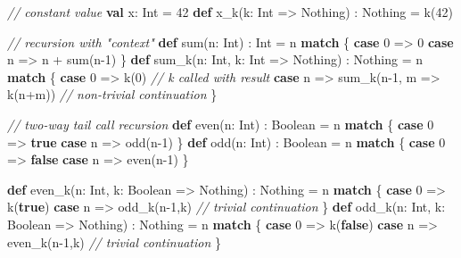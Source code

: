 \documentclass[]{article}
\newenvironment{Shaded}{}{}
\newcommand{\CommentTok}[1]{\textcolor[rgb]{0.38,0.63,0.69}{\textit{#1}}}
\newcommand{\DecValTok}[1]{\textcolor[rgb]{0.25,0.63,0.44}{#1}}
\newcommand{\FunctionTok}[1]{\textcolor[rgb]{0.02,0.16,0.49}{#1}}
\newcommand{\KeywordTok}[1]{\textcolor[rgb]{0.00,0.44,0.13}{\textbf{#1}}}
\newcommand{\NormalTok}[1]{#1}
\begin{document}
\begin{Shaded}
\begin{Highlighting}[]
\CommentTok{// constant value}
\KeywordTok{val}\NormalTok{ x: Int = }\DecValTok{42}
\KeywordTok{def} \FunctionTok{x\_k}\NormalTok{(k: Int =\textgreater{} Nothing) : Nothing = }\FunctionTok{k}\NormalTok{(}\DecValTok{42}\NormalTok{)}

\CommentTok{// recursion with "context"}
\KeywordTok{def} \FunctionTok{sum}\NormalTok{(n: Int) : Int = n }\KeywordTok{match}\NormalTok{ \{}
  \KeywordTok{case} \DecValTok{0}\NormalTok{ =\textgreater{} }\DecValTok{0}
  \KeywordTok{case}\NormalTok{ n =\textgreater{} n + }\FunctionTok{sum}\NormalTok{(n}\DecValTok{{-}1}\NormalTok{)}
\NormalTok{\}}
\KeywordTok{def} \FunctionTok{sum\_k}\NormalTok{(n: Int, k: Int =\textgreater{} Nothing) : Nothing = n }\KeywordTok{match}\NormalTok{ \{}
  \KeywordTok{case} \DecValTok{0}\NormalTok{ =\textgreater{} }\FunctionTok{k}\NormalTok{(}\DecValTok{0}\NormalTok{) }\CommentTok{// k called with result}
  \KeywordTok{case}\NormalTok{ n =\textgreater{} }\FunctionTok{sum\_k}\NormalTok{(n}\DecValTok{{-}1}\NormalTok{, m =\textgreater{} }\FunctionTok{k}\NormalTok{(n+m)) }\CommentTok{// non{-}trivial continuation}
\NormalTok{\}}

\CommentTok{// two{-}way tail call recursion}
\KeywordTok{def} \FunctionTok{even}\NormalTok{(n: Int) : Boolean = n }\KeywordTok{match}\NormalTok{ \{}
  \KeywordTok{case} \DecValTok{0}\NormalTok{ =\textgreater{} }\KeywordTok{true}
  \KeywordTok{case}\NormalTok{ n =\textgreater{} }\FunctionTok{odd}\NormalTok{(n}\DecValTok{{-}1}\NormalTok{)}
\NormalTok{\}}
\KeywordTok{def} \FunctionTok{odd}\NormalTok{(n: Int) : Boolean = n }\KeywordTok{match}\NormalTok{ \{}
  \KeywordTok{case} \DecValTok{0}\NormalTok{ =\textgreater{} }\KeywordTok{false}
  \KeywordTok{case}\NormalTok{ n =\textgreater{} }\FunctionTok{even}\NormalTok{(n}\DecValTok{{-}1}\NormalTok{)}
\NormalTok{\}}

\KeywordTok{def} \FunctionTok{even\_k}\NormalTok{(n: Int, k: Boolean =\textgreater{} Nothing) : Nothing = n }\KeywordTok{match}\NormalTok{ \{}
  \KeywordTok{case} \DecValTok{0}\NormalTok{ =\textgreater{} }\FunctionTok{k}\NormalTok{(}\KeywordTok{true}\NormalTok{)}
  \KeywordTok{case}\NormalTok{ n =\textgreater{} }\FunctionTok{odd\_k}\NormalTok{(n}\DecValTok{{-}1}\NormalTok{,k) }\CommentTok{// trivial continuation}
\NormalTok{\}}
\KeywordTok{def} \FunctionTok{odd\_k}\NormalTok{(n: Int, k: Boolean =\textgreater{} Nothing) : Nothing = n }\KeywordTok{match}\NormalTok{ \{}
  \KeywordTok{case} \DecValTok{0}\NormalTok{ =\textgreater{} }\FunctionTok{k}\NormalTok{(}\KeywordTok{false}\NormalTok{)}
  \KeywordTok{case}\NormalTok{ n =\textgreater{} }\FunctionTok{even\_k}\NormalTok{(n}\DecValTok{{-}1}\NormalTok{,k) }\CommentTok{// trivial continuation}
\NormalTok{\}}
\end{Highlighting}
\end{Shaded}
\end{document}
